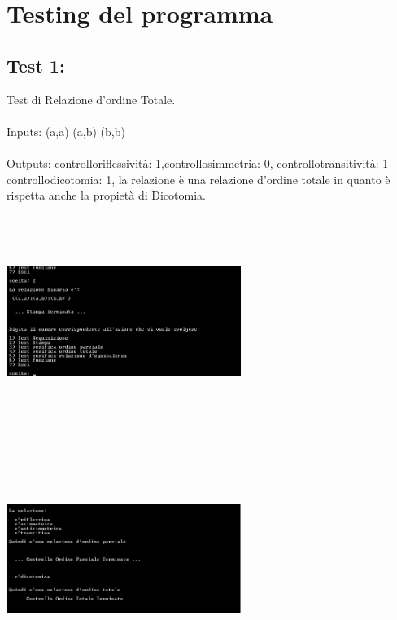 \documentclass[11pt, a4paper, titlepage, block]{article}
\begin{document}
	
	
	\newpage
	\section{Testing del programma}
	\subsection{Test 1:}
	Test di Relazione d'ordine Totale.\\
	\\
	Inputs:  (a,a)  (a,b)  (b,b) \\
	\\
	Outputs: controlloriflessivit\`a:  1,controllosimmetria:  0, controllotransitivit\`a:  1
	controllodicotomia:  1, la relazione \`e una relazione d'ordine totale in quanto \`e rispetta anche la propiet\`a di Dicotomia.\\
	\includegraphics[width=3in,height=3in,viewport=0 0 300 300]{../Screenshots/Test1Input.jpg}
	\\
	\includegraphics[width=3in,height=3in,viewport=0 0 300 300]{../Screenshots/Test1Output.png}
	\newpage
\end{document}
